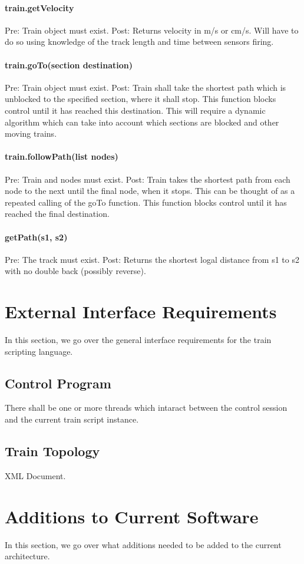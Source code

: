 \documentclass[a4paper,11pt,notitlepage]{article}
\begin{document}
\paragraph{train.getVelocity} Pre: Train object must exist. Post: Returns velocity in m/s or cm/s. Will have to do so using knowledge of the track length and time between sensors firing.
\paragraph{train.goTo(section destination)} Pre: Train object must exist. Post: Train shall take the shortest path which is unblocked to the specified section, where it shall stop. This function blocks control until it has reached this destination. This will require a dynamic algorithm which can take into account which sections are blocked and other moving trains.
\paragraph{train.followPath(list nodes)} Pre: Train and nodes must exist. Post: Train takes the shortest path from each node to the next until the final node, when it stops. This can be thought of as a repeated calling of the goTo function. This function blocks control until it has reached the final destination.
\paragraph{getPath(s1, s2)} Pre: The track must exist.  Post: Returns the shortest logal distance from s1 to s2 with no double back (possibly reverse).

\newpage
\section{External Interface Requirements}
    In this section, we go over the general interface requirements for the train scripting language.
\subsection{Control Program}
    There shall be one or more threads which intaract between the control session and the current train script instance.
\subsection{Train Topology}
	XML Document.

\newpage
\section{Additions to Current Software}
    In this section, we go over what additions needed to be added to the current architecture.
\end{document}
